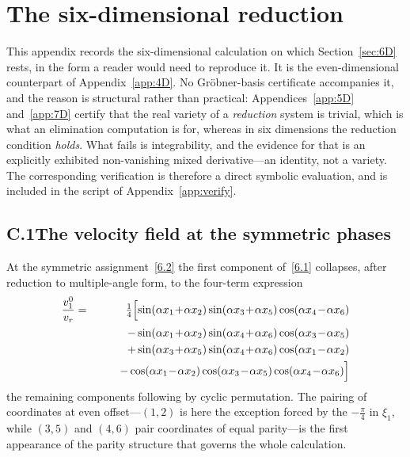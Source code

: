 \documentclass[11pt]{jfm}
\numberwithin{equation}{section}
\begin{document}
\section{The six-dimensional reduction}
\label{app:6D}
This appendix records the six-dimensional calculation on which Section~\ref{sec:6D} rests, in the
form a reader would need to reproduce it. It is the even-dimensional counterpart of
Appendix~\ref{app:4D}. No Gr\"obner-basis certificate accompanies it, and the reason is structural
rather than practical: Appendices~\ref{app:5D} and~\ref{app:7D} certify that the real variety of a
\emph{reduction} system is trivial, which is what an elimination computation is for, whereas in six
dimensions the reduction condition \emph{holds}. What fails is integrability, and the evidence for
that is an explicitly exhibited non-vanishing mixed derivative---an identity, not a variety. The
corresponding verification is therefore a direct symbolic evaluation, and is included in the script
of Appendix~\ref{app:verify}.

\subsection*{C.1\quad The velocity field at the symmetric phases}
At the symmetric assignment~\eqref{6.2} the first component of~\eqref{6.1} collapses, after
reduction to multiple-angle form, to the four-term expression
\begin{eqnarray}
\label{A6.1}
\frac{v_1^0}{v_r}&=&\tfrac14\Bigl[
\sin(\alpha x_1\!+\!\alpha x_2)\sin(\alpha x_3\!+\!\alpha x_5)\cos(\alpha x_4\!-\!\alpha x_6)
\nonumber\\ && \qquad
-\sin(\alpha x_1\!+\!\alpha x_2)\sin(\alpha x_4\!+\!\alpha x_6)\cos(\alpha x_3\!-\!\alpha x_5)
\nonumber\\ && \qquad
+\sin(\alpha x_3\!+\!\alpha x_5)\sin(\alpha x_4\!+\!\alpha x_6)\cos(\alpha x_1\!-\!\alpha x_2)
\nonumber\\ && \qquad
-\cos(\alpha x_1\!-\!\alpha x_2)\cos(\alpha x_3\!-\!\alpha x_5)\cos(\alpha x_4\!-\!\alpha x_6)
\Bigr]\nonumber\\
\end{eqnarray}
the remaining components following by cyclic permutation. The pairing of coordinates at even
offset---$(1,2)$ is here the exception forced by the $-\tfrac{\pi}{4}$ in $\xi_1$, while
$(3,5)$ and $(4,6)$ pair coordinates of equal parity---is the first appearance of the parity
structure that governs the whole calculation.
\end{document}
